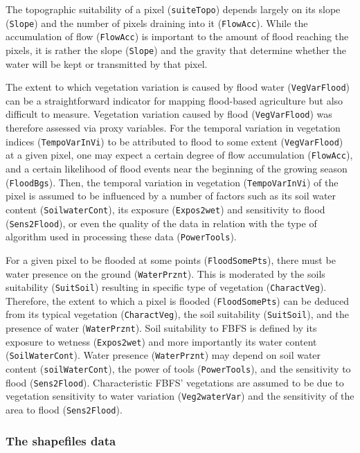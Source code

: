 \documentclass[12pt,oneside]{article}
\begin{document}
The topographic suitability of a pixel (\texttt{suiteTopo}) depends largely on its slope (\texttt{Slope}) and the number of pixels draining into it (\texttt{FlowAcc}). While the accumulation of flow (\texttt{FlowAcc}) is important to the amount of flood reaching the pixels, it is rather the slope (\texttt{Slope}) and the gravity that determine whether the water will be kept or transmitted by that pixel.

The extent to which vegetation variation is caused by flood water (\texttt{VegVarFlood}) can be a straightforward indicator for mapping flood-based agriculture but also difficult to measure. Vegetation variation caused by flood (\texttt{VegVarFlood}) was therefore assessed via proxy variables. For the temporal variation in vegetation indices (\texttt{TempoVarInVi}) to be attributed to flood to some extent (\texttt{VegVarFlood}) at a given pixel, one may expect a certain degree of flow accumulation (\texttt{FlowAcc}), and a certain likelihood of flood events near the beginning of the growing season (\texttt{FloodBgs}). Then, the temporal variation in vegetation (\texttt{TempoVarInVi}) of the pixel is assumed to be influenced by a number of factors such as its soil water content (\texttt{SoilwaterCont}), its exposure (\texttt{Expos2wet}) and sensitivity to flood (\texttt{Sens2Flood}), or even the quality of the data in relation with the type of algorithm used in processing these data (\texttt{PowerTools}).

For a given pixel to be flooded at some points (\texttt{FloodSomePts}), there must be water presence on the ground (\texttt{WaterPrznt}). This is moderated by the soils suitability (\texttt{SuitSoil}) resulting in specific type of vegetation (\texttt{CharactVeg}). Therefore, the extent to which a pixel is flooded (\texttt{FloodSomePts}) can be deduced from its typical vegetation (\texttt{CharactVeg}), the soil suitability (\texttt{SuitSoil}), and the presence of water (\texttt{WaterPrznt}). Soil suitability to FBFS is defined by its exposure to wetness (\texttt{Expos2wet}) and more importantly its water content (\texttt{SoilWaterCont}). Water presence (\texttt{WaterPrznt}) may depend on soil water content (\texttt{soilWaterCont}), the power of tools (\texttt{PowerTools}), and the sensitivity to flood (\texttt{Sens2Flood}). Characteristic FBFS' vegetations are assumed to be due to vegetation sensitivity to water variation (\texttt{Veg2waterVar}) and the sensitivity of the area to flood (\texttt{Sens2Flood}).

\hypertarget{I32}{%
\subsubsection{The shapefiles data}\label{I32}}
\end{document}
